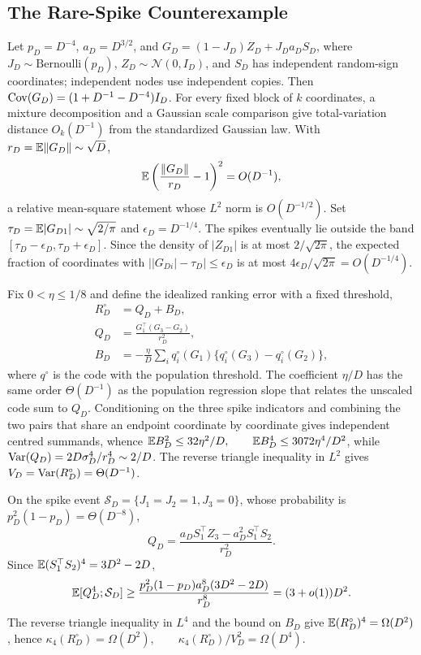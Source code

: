 \subsection{The Rare-Spike Counterexample}
\label{app:p8}

Let $p_D=D^{-4}$, $a_D=D^{3/2}$, and
$G_D=(1-J_D)Z_D+J_Da_DS_D$,
where $J_D\sim\mathrm{Bernoulli}(p_D)$, $Z_D\sim\mathcal N(0,I_D)$, and $S_D$ has independent random-sign coordinates; independent nodes use independent copies. Then $\operatorname{Cov}(G_D)=(1+D^{-1}-D^{-4})I_D$. For every fixed block of $k$ coordinates, a mixture decomposition and a Gaussian scale comparison give total-variation distance $O_k(D^{-1})$ from the standardized Gaussian law. With $r_D=\mathbb{E}\|G_D\|\sim\sqrt D$,
\begin{equation}
\mathbb{E}\left(\frac{\|G_D\|}{r_D}-1\right)^2=O(D^{-1}),
\end{equation}
a relative mean-square statement whose $L^2$ norm is $O(D^{-1/2})$. Set $\tau_D=\mathbb{E}|G_{D1}|\sim\sqrt{2/\pi}$ and $\epsilon_D=D^{-1/4}$. The spikes eventually lie outside the band $[\tau_D-\epsilon_D,\tau_D+\epsilon_D]$. Since the density of $|Z_{D1}|$ is at most $2/\sqrt{2\pi}$, the expected fraction of coordinates with $\bigl||G_{Di}|-\tau_D\bigr|\le\epsilon_D$ is at most $4\epsilon_D/\sqrt{2\pi}=O(D^{-1/4})$.

Fix $0<\eta\le1/8$ and define the idealized ranking error with a fixed threshold,
\begin{align}
R_D^\circ&=Q_D+B_D,\\
Q_D&=\frac{G_1^\top(G_3-G_2)}{r_D^2},\\
B_D&=-\frac{\eta}{D}\sum_iq_i^\circ(G_1)\{q_i^\circ(G_3)-q_i^\circ(G_2)\},
\end{align}
where $q^\circ$ is the code with the population threshold. The coefficient $\eta/D$ has the same order $\Theta(D^{-1})$ as the population regression slope that relates the unscaled code sum to $Q_D$. Conditioning on the three spike indicators and combining the two pairs that share an endpoint coordinate by coordinate gives independent centred summands, whence
$\mathbb{E} B_D^2\le32\eta^2/D,\qquad\mathbb{E} B_D^4\le3072\eta^4/D^2$,
while $\operatorname{Var}(Q_D)=2D\sigma_D^4/r_D^4\sim2/D$. The reverse triangle inequality in $L^2$ gives $V_D=\operatorname{Var}(R_D^\circ)=\Theta(D^{-1})$.

On the spike event $\mathcal S_D=\{J_1=J_2=1,J_3=0\}$, whose probability is $p_D^2(1-p_D)=\Theta(D^{-8})$,
\begin{equation}
Q_D=\frac{a_DS_1^\top Z_3-a_D^2S_1^\top S_2}{r_D^2}.
\end{equation}
Since $\mathbb{E}(S_1^\top S_2)^4=3D^2-2D$,
\begin{equation}
\mathbb{E}[Q_D^4;\mathcal S_D]\ge\frac{p_D^2(1-p_D)a_D^8(3D^2-2D)}{r_D^8}=(3+o(1))D^2.
\end{equation}
The reverse triangle inequality in $L^4$ and the bound on $B_D$ give $\mathbb{E}(R_D^\circ)^4=\Omega(D^2)$, hence
$\kappa_4(R_D^\circ)=\Omega(D^2),\qquad\kappa_4(R_D^\circ)/V_D^2=\Omega(D^4)$.

